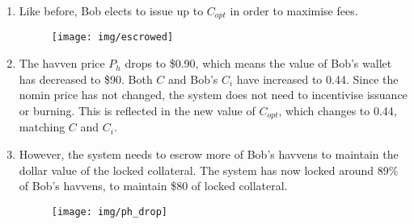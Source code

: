 \begin{enumerate}
\item{Like before, Bob elects to issue up to \(C_{opt}\) in order to maximise fees.}
\begin{figure}[h!]
    \centering
    \texttt{[image: img/escrowed]}
\end{figure}
\item{The havven price \(P_h\) drops to \$0.90, which means the value of Bob's wallet has decreased to \$90. Both \(C\) and Bob's \(C_i\) have increased to 0.44. Since the nomin price has not changed, the system does not need to incentivise issuance or burning. This is reflected in the new value of \(C_{opt}\), which changes to 0.44, matching \(C\) and \(C_i\). }
\item{However, the system needs to escrow more of Bob's havvens to maintain the dollar value of the locked collateral. The system has now locked around 89\% of Bob's havvens, to maintain \$80 of locked collateral.}
\begin{figure}[h!]
    \centering
    \texttt{[image: img/ph\_drop]}
\end{figure}
\end{enumerate} 
